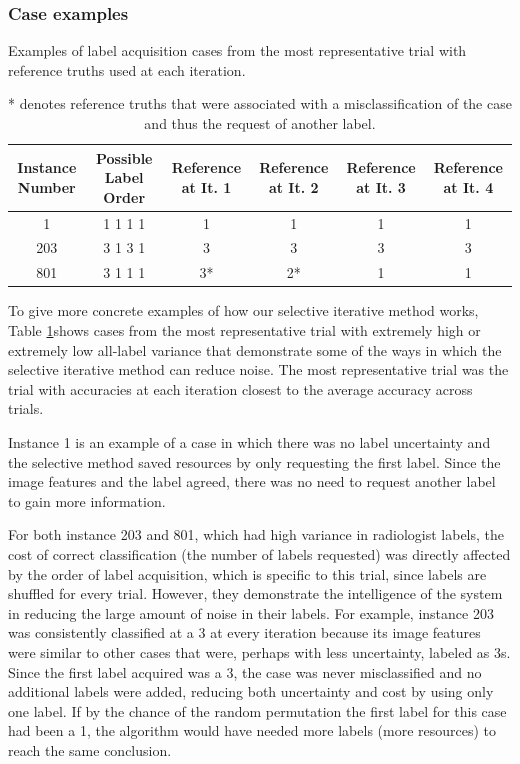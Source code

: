 \documentclass[]{spie}
\begin{document}
   \subsubsection{Case examples}
    \begin{table}[h]
    \centering
    \captionsetup{width=15cm}
    \caption{Examples of label acquisition cases from the most representative trial with reference truths used at each iteration.} 
    \vfill
    \begin{tabular}{|c|c|c|c|c|c|}
    \toprule
 \multicolumn{1}{|p{2cm}|}{\centering Instance Number} & \multicolumn{1}{|p{2cm}|}{\centering Possible Label Order} & \multicolumn{1}{|p{2cm}|}{\centering Reference at It. 1} & \multicolumn{1}{|p{\textwidth/8}|}{\centering Reference at It. 2} & \multicolumn{1}{|p{2cm}|}{\centering Reference at It. 3} & \multicolumn{1}{|p{2cm}|}{\centering Reference at It. 4}\\
    \midrule
        1 & 1 1 1 1 & 1 & 1 & 1 & 1\\
            \hline
        203 & 3 1 3 1 & 3 & 3 & 3 & 3\\
            \hline
        801 & 3 1 1 1 & 3* & 2* & 1 & 1\\
    \bottomrule
    \end{tabular}
        \caption*{* denotes reference truths that were associated with a misclassification of the case and thus the request of another label.}
  \label{tab:examples}
\end{table}
To give more concrete examples of how our selective iterative method works, Table \ref{tab:examples}shows cases from the most representative trial with extremely high or extremely low all-label variance that demonstrate some of the ways in which the selective iterative method can reduce noise. The most representative trial was the trial with accuracies at each iteration closest to the average accuracy across trials.

Instance 1 is an example of a case in which there was no label uncertainty and the selective method saved resources by only requesting the first label. Since the image features and the label agreed, there was no need to request another label to gain more information.
   
For both instance 203 and 801, which had high variance in radiologist labels, the cost of correct classification (the number of labels requested) was directly affected by the order of label acquisition, which is specific to this trial, since labels are shuffled for every trial. However, they demonstrate the intelligence of the system in reducing the large amount of noise in their labels. For example, instance 203 was consistently classified at a 3 at every iteration because its image features were similar to other cases that were, perhaps with less uncertainty, labeled as 3s. Since the first label acquired was a 3, the case was never misclassified and no additional labels were added, reducing both uncertainty and cost by using only one label. If by the chance of the random permutation the first label for this case had been a 1, the algorithm would have needed more labels (more resources) to reach the same conclusion.
\end{document}
